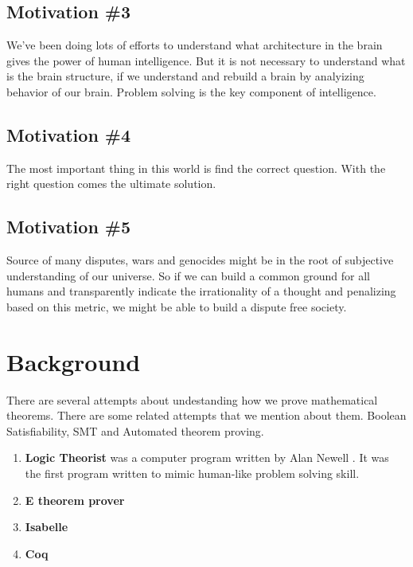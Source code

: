 \documentclass{article}
\begin{document}
\subsection{Motivation \#3} 

We've been doing lots of efforts to understand what architecture in the brain gives the power of human intelligence. But it is not necessary to understand what is the brain structure, if we understand and rebuild a brain by analyizing behavior of our brain. Problem solving is the key component of intelligence. 


\subsection{Motivation \#4} 
The most important thing in this world is find the correct question. With the right question comes the ultimate solution.


\subsection{Motivation \#5} 

Source of many disputes, wars and genocides might be in the root of subjective understanding of our universe. So if we can build a common ground for all humans and transparently indicate the irrationality of a thought and penalizing based on this metric, we might be able to build a dispute free society.

\section{Background}

There are several attempts about undestanding how we prove mathematical theorems. There are some related attempts that we mention about them. Boolean Satisfiability, SMT and Automated theorem proving.

\begin{enumerate}

\item \textbf{Logic Theorist} was a computer program written by Alan Newell . It was the first program written to mimic human-like problem solving skill. 

\item \textbf{E theorem prover}

\item \textbf{Isabelle}


\item \textbf{Coq}

\end{enumerate}
\end{document}
